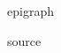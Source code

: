 \documentclass[oneside,english,oldfontcommands]{memoir}
\begin{document}
\epigraph{epigraph}{source}
\end{document}
